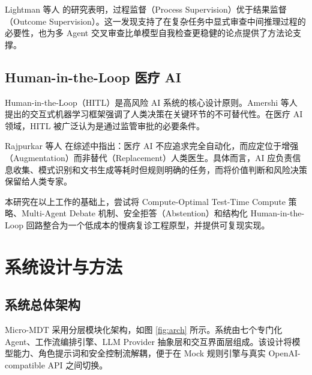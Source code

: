 \documentclass[11pt,a4paper]{ctexart}
\begin{document}
Lightman 等人 \cite{lightman2024let} 的研究表明，过程监督（Process Supervision）优于结果监督（Outcome Supervision）。这一发现支持了在复杂任务中显式审查中间推理过程的必要性，也为多 Agent 交叉审查比单模型自我检查更稳健的论点提供了方法论支撑。

\subsection{Human-in-the-Loop 医疗 AI}

Human-in-the-Loop（HITL）是高风险 AI 系统的核心设计原则。Amershi 等人 \cite{amershi2014power} 提出的交互式机器学习框架强调了人类决策在关键环节的不可替代性。在医疗 AI 领域，HITL 被广泛认为是通过监管审批的必要条件。

Rajpurkar 等人 \cite{rajpurkar2022ai} 在综述中指出：医疗 AI 不应追求完全自动化，而应定位于增强（Augmentation）而非替代（Replacement）人类医生。具体而言，AI 应负责信息收集、模式识别和文书生成等耗时但规则明确的任务，而将价值判断和风险决策保留给人类专家。

本研究在以上工作的基础上，尝试将 Compute-Optimal Test-Time Compute 策略、Multi-Agent Debate 机制、安全拒答（Abstention）和结构化 Human-in-the-Loop 回路整合为一个低成本的慢病复诊工程原型，并提供可复现实现。

\newpage
\section{系统设计与方法}

\subsection{系统总体架构}

Micro-MDT 采用分层模块化架构，如图 \ref{fig:arch} 所示。系统由七个专门化 Agent、工作流编排引擎、LLM Provider 抽象层和交互界面层组成。该设计将模型能力、角色提示词和安全控制流解耦，便于在 Mock 规则引擎与真实 OpenAI-compatible API 之间切换。
\end{document}
